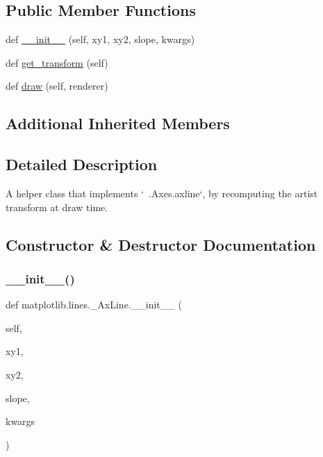 \subsection*{Public Member Functions}
\begin{DoxyCompactItemize}
\item 
def \hyperlink{classmatplotlib_1_1lines_1_1__AxLine_a6313e5f0566e9c28e1c3cd06c5ddfcbd}{\+\_\+\+\_\+init\+\_\+\+\_\+} (self, xy1, xy2, slope, kwargs)
\item 
def \hyperlink{classmatplotlib_1_1lines_1_1__AxLine_a189ebe6ec0486614627a24c8f845699f}{get\+\_\+transform} (self)
\item 
def \hyperlink{classmatplotlib_1_1lines_1_1__AxLine_a69274cb971a92ec98e47d36d361f47a8}{draw} (self, renderer)
\end{DoxyCompactItemize}
\subsection*{Additional Inherited Members}


\subsection{Detailed Description}
\begin{DoxyVerb}A helper class that implements `~.Axes.axline`, by recomputing the artist
transform at draw time.
\end{DoxyVerb}
 

\subsection{Constructor \& Destructor Documentation}
\mbox{\label{classmatplotlib_1_1lines_1_1__AxLine_a6313e5f0566e9c28e1c3cd06c5ddfcbd}} 
\subsubsection{\texorpdfstring{\+\_\+\+\_\+init\+\_\+\+\_\+()}{\_\_init\_\_()}}
{\footnotesize\ttfamily def matplotlib.\+lines.\+\_\+\+Ax\+Line.\+\_\+\+\_\+init\+\_\+\+\_\+ (\begin{DoxyParamCaption}\item[{}]{self,  }\item[{}]{xy1,  }\item[{}]{xy2,  }\item[{}]{slope,  }\item[{}]{kwargs }\end{DoxyParamCaption})}



